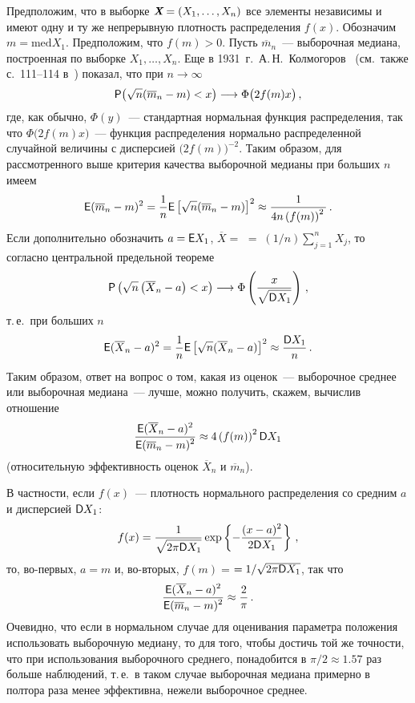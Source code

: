 \begin{multicols}{2}
Предположим, что в выборке $\emph{\textbf{X}}=(X_1,\ldots,X_n)$
все элементы независимы и имеют одну и ту же непрерывную плотность
распределения $f(x)$. Обозначим $m={\mbox{med}}X_1$. Предположим,
что $f(m)>0$. Пусть $\overline m_n$~--- выборочная медиана,
построенная по выборке $X_1,\ldots,X_n$. Еще в 1931~г.\ А.\,Н.~Колмогоров~\cite{Kolmogorov1931}
(см.\ также с.~111--114 в~\cite{Kolmogorov1986}) показал, что при $n\to\infty$
$$
{\sf P}\big(\sqrt{n}(\overline m_n-m)<x\big)\longrightarrow
\Phi\big(2f(m)x\big)\,,
$$
где, как обычно, $\Phi(y)$~--- стандартная нормальная функция
распределения, так что $\Phi\big(2f(m)x\big)$~--- функция
распределения нормально распределенной случайной величины с
дисперсией $\big(2f(m)\big)^{-2}$. Таким образом, для
рассмотренного выше критерия качества выборочной медианы при
больших $n$ имеем
$$
{\sf E}(\overline m_n-m)^2=\displaystyle\frac{\displaystyle 1\mathstrut}{\displaystyle n\mathstrut}{\sf
E}\left[\sqrt{n} (\overline
m_n-m)\right]^2\approx\displaystyle\frac{\displaystyle 1\mathstrut}{\displaystyle 4n\left(f(m)\right)^2\mathstrut}\,.
$$
Если дополнительно обозначить $a={\sf E}X_1$, $\overline X=$\linebreak
$=\;(1/n)\sum\limits_{j=1}^nX_j$, то согласно центральной предельной
теореме
$$
{\sf P}\left(\sqrt{n}\left( \overline X_n-a\right ) <x\right)\longrightarrow
\Phi\left ( \displaystyle\frac{\displaystyle x\mathstrut}{\displaystyle \sqrt{{\sf D}X_1}\mathstrut}\right )\,,
$$
т.\,е.\ при больших $n$
$$
{\sf E}(\overline X_n-a)^2=\displaystyle\frac{\displaystyle 1\mathstrut}{\displaystyle n\mathstrut}{\sf
E}\left[\sqrt{n} (\overline X_n-a)\right]^2\approx\displaystyle\frac{\displaystyle {\sf
D}X_1\mathstrut}{\displaystyle n\mathstrut}\,.
$$
Таким образом, ответ на вопрос о том, какая из оценок~---
выборочное среднее или выборочная медиана~--- лучше, можно
получить, скажем, вычислив отношение
$$
\displaystyle\frac{\displaystyle {\sf E}(\overline X_n-a)^2\mathstrut}{\displaystyle {\sf E}(\overline
m_n-m)^2\mathstrut}\approx 4\left(f(m)\right)^2{\sf D}X_1
$$
(относительную эффективность оценок $\overline X_n$ и $\overline
m_n$).

В частности, если
$f(x)$~--- плотность нормального распределения со средним $a$ и дисперсией
${\sf D}X_1$:
$$
f(x)=\displaystyle\frac{\displaystyle 1\mathstrut}{\displaystyle \sqrt{2\pi{\sf D}X_1}\mathstrut}\exp\left\{-\displaystyle\frac{\displaystyle (x-a)^2\mathstrut}{\displaystyle 2
{\sf D}X_1\mathstrut}\right\}\,,
$$
то, во-первых, $a=m$ и, во-вторых, $f(m)=$\linebreak $=1/
\sqrt{2\pi{\sf D}X_1}$, так что
$$
\displaystyle\frac{\displaystyle {\sf E}(\overline X_n-a)^2\mathstrut}{\displaystyle {\sf E}(\overline
m_n-m)^2\mathstrut}\approx \displaystyle\frac{\displaystyle 2\mathstrut}{\displaystyle \pi\mathstrut}\,.
$$
Очевидно, что если в нормальном случае для оценивания параметра
положения использовать выборочную медиану, то для того, чтобы
достичь той же точности, что при использования выборочного
среднего, понадобится в $\pi/2\approx 1.57$ раз больше наблюдений,
т.\,е.\ в таком случае выборочная медиана примерно в полтора раза
менее эффективна, нежели выборочное среднее.



\end{multicols}
